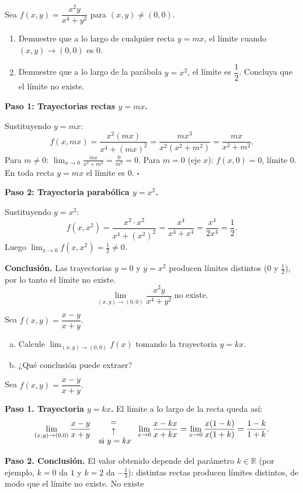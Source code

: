 \begin{prob}
Sea $f(x,y)=\dfrac{x^2 y}{x^4+y^2}$ para $(x,y)\neq(0,0)$.
\begin{enumerate}
    \item Demuestre que a lo largo de cualquier recta $y=mx$, el límite
    cuando $(x,y)\to(0,0)$ es $0$.
    \item Demuestre que a lo largo de la parábola $y=x^2$, el límite
    es $\dfrac{1}{2}$. Concluya que el límite no existe.
\end{enumerate}
\begin{myproof}
\textbf{Paso 1: Trayectorias rectas $y=mx$.}

Sustituyendo $y=mx$:
\[
  f(x,mx) = \frac{x^2(mx)}{x^4+(mx)^2} = \frac{mx^3}{x^2(x^2+m^2)} = \frac{mx}{x^2+m^2}.
\]
Para $m\neq 0$: $\displaystyle\lim_{x\to 0}\frac{mx}{x^2+m^2}=\frac{0}{m^2}=0$.
Para $m=0$ (eje $x$): $f(x,0)=0$, límite $0$.
En toda recta $y=mx$ el límite es $0$. $\square$

\textbf{Paso 2: Trayectoria parabólica $y=x^2$.}

Sustituyendo $y=x^2$:
\[
  f(x,x^2) = \frac{x^2\cdot x^2}{x^4+(x^2)^2} = \frac{x^4}{x^4+x^4} = \frac{x^4}{2x^4} = \frac{1}{2}.
\]
Luego $\displaystyle\lim_{x\to 0}f(x,x^2)=\frac{1}{2}\neq 0$.

\textbf{Conclusión.} Las trayectorias $y=0$ y $y=x^2$ producen límites distintos ($0$ y $\tfrac{1}{2}$), por lo tanto el límite no existe.
\[
  \boxed{\lim_{(x,y)\to(0,0)}\frac{x^2 y}{x^4+y^2}\;\text{no existe.}}
\]
\end{myproof}
\end{prob}


\begin{prob}
Sea $f(x,y)=\dfrac{x-y}{x+y}.$
\begin{enumerate}[(a)]
    \item Calcule $\displaystyle\lim_{(x,y)\to (0,0)}f(x)$ tomando la trayectoria $y=kx.$
    \item ¿Qué conclusión puede extraer?
\end{enumerate}
\begin{myproof}
Sea $f(x,y)=\dfrac{x-y}{x+y}.$

\textbf{Paso 1. Trayectoria $y=kx$.} El límite a lo largo de la recta queda así:
\begin{align*}
\displaystyle\lim_{(x,y)\to (0,0)} \dfrac{x-y}{x+y} {{=}\atop {\begin{array}{c}
\uparrow\\ \text{ si $y=kx$}\end{array}} } \displaystyle\lim_{x\to 0}\dfrac{x-kx}{x+kx}=\displaystyle\lim_{x\to 0}\dfrac{x(1-k)}{x(1+k)}=\dfrac{1-k}{1+k}.
\end{align*}

\textbf{Paso 2. Conclusión.} El valor obtenido depende del parámetro $k\in\mathbb{R}$ (por ejemplo, $k=0$ da $1$ y $k=2$ da $-\tfrac{1}{3}$): distintas rectas producen límites distintos, de modo que el límite no existe.
$\boxed{\text{No existe}}$
\end{myproof}
\end{prob}

